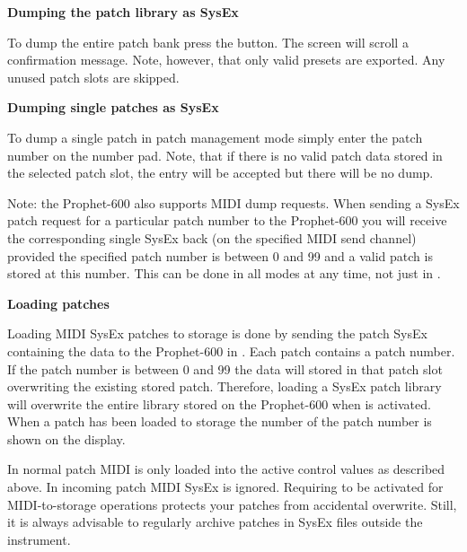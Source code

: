 {
}


\textbf{Dumping the patch library as SysEx} 

To dump the entire patch bank press the \preset button. The screen will scroll a confirmation message. Note, however, that only valid presets are exported. Any unused patch slots are skipped.

\textbf{Dumping single patches as SysEx} 

To dump a single patch in patch management mode simply enter the patch number on the number pad. Note, that if there is no valid patch data stored in the selected patch slot, the entry will be accepted but there will be no dump.

Note: the Prophet-600 also supports MIDI dump requests. When sending a SysEx patch request for a particular patch number to the Prophet-600 you will receive the corresponding single SysEx back (on the specified MIDI send channel) provided the specified patch number is between 0 and 99 and a valid patch is stored at this number. This can be done in all modes at any time, not just in \patchmgmt.

\textbf{Loading patches} 

Loading MIDI SysEx patches to storage is done by sending the patch SysEx containing the data to the Prophet-600 in \patchmgmt. Each patch contains a patch number. If the patch number is  between 0 and 99 the data will stored in that patch slot overwriting the existing stored patch. Therefore, loading a SysEx patch library will overwrite the entire library stored on the Prophet-600 when \patchmgmt is activated. When a patch has been loaded to storage the number of the patch number is shown on the display.

In normal \presetmode patch MIDI is only loaded into the active control values as described above. In \livemode incoming patch MIDI SysEx is ignored. Requiring \patchmgmt to be activated for MIDI-to-storage operations protects your patches from accidental overwrite. Still, it is always advisable to regularly archive patches in SysEx files outside the instrument.
